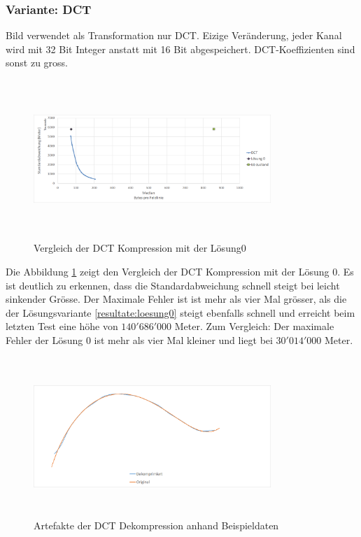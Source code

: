 \subsubsection{Variante: DCT}\label{resultate:dct}
Bild
verwendet als Transformation nur DCT. Eizige Veränderung, jeder Kanal wird mit 32 Bit Integer anstatt mit 16 Bit abgespeichert. DCT-Koeffizienten sind sonst zu gross.
\begin{figure}[!htbp]
	\center
	\includegraphics[width=0.8\textwidth,height=6cm,keepaspectratio]{./pictures/resultate/loesung1/loesung1-0/loesung1_0.png}
	\caption{Vergleich der DCT Kompression mit der Lösung0}
	\label{resultate:loesung1:dct:resultate}
\end{figure}
Die Abbildung \ref{resultate:loesung1:dct:resultate} zeigt den Vergleich der DCT Kompression mit der Lösung 0. Es ist deutlich zu erkennen, dass die Standardabweichung schnell steigt bei leicht sinkender Grösse. Der Maximale Fehler ist ist mehr als vier Mal grösser, als die der Lösungsvariante \ref{resultate:loesung0} steigt ebenfalls schnell und erreicht beim letzten Test eine höhe von $140'686'000$ Meter. Zum Vergleich: Der maximale Fehler der Lösung 0 ist mehr als vier Mal kleiner und liegt bei $30'014'000$ Meter.\\
\begin{figure}[!htbp]
	\center
	\includegraphics[width=0.8\textwidth,height=6cm,keepaspectratio]{./pictures/resultate/loesung1/loesung1-0/loesung1_0_artefakte.png}
	\caption{Artefakte der DCT Dekompression anhand Beispieldaten}
	\label{resultate:loesung1:dct:artefakte}
\end{figure}
